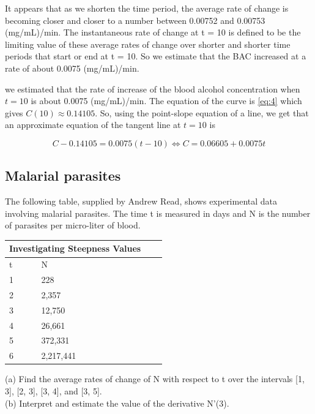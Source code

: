 \begin{flushleft}
It appears that as we shorten the time period, the average rate of change is becoming closer and closer to a number between 0.00752 and 0.00753 (mg/mL)/min. The instantaneous rate of change at t = 10 is defined to be the limiting value of these average rates of change over shorter and shorter time periods that start or end at t = 10. So we estimate that the BAC increased at a rate of about 0.0075 (mg/mL)/min.

we estimated that the rate of increase of the blood alcohol concentration when $t = 10$ is about 0.0075 (mg/mL)/min. The equation of the curve is \ref{eq:4} which gives $C(10) \approx 0.14105$. So, using the point-slope equation of a line, we get that an approximate equation of the tangent line at $t=10$ is 
\end{flushleft}

\begin{equation}
\label{eq:5}
C - 0.14105 = 0.0075(t - 10)
\Leftrightarrow C = 0.06605 + 0.0075t
\end{equation}

\subsection{Malarial parasites}
The following table, supplied by Andrew Read, shows experimental data involving malarial parasites. The time t is measured in days and N is the number of parasites per micro-liter of blood.

\begin{tabular}{ |p{3cm}||p{3cm}|p{3cm}|p{3cm}|}
 \hline
 \multicolumn{2}{|c|}{Investigating Steepness Values} \\
 \hline
 t & N\\
 \hline
 1    & 228\\
 2    & 2,357\\
 3    & 12,750\\
 4    & 26,661\\
 5    & 372,331\\
 6    & 2,217,441\\
 \hline
\end{tabular}

\begin{flushleft}
(a) Find the average rates of change of N with respect to t over the intervals [1, 3], [2, 3], [3, 4], and [3, 5].\\
(b) Interpret and estimate the value of the derivative N'(3).
\end{flushleft}

